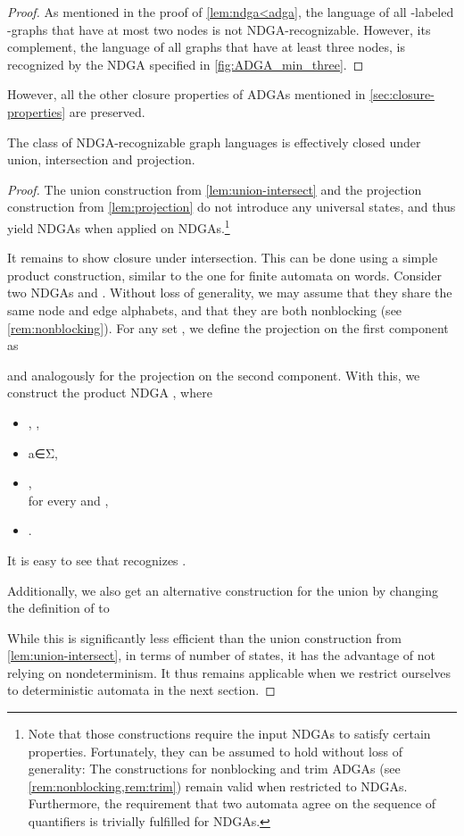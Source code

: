 \documentclass[a4paper,11pt,twoside]{report} \pdfoutput=1
\begin{document}
\begin{proof}
  As mentioned in the proof of \cref{lem:ndga<adga}, the language
   of all -labeled -graphs that
  have at most two nodes is not NDGA-recognizable. However, its
  complement, the language  of all graphs that have at
  least three nodes, is recognized by the NDGA  specified
  in \cref{fig:ADGA_min_three}.
\end{proof}

However, all the other closure properties of ADGAs mentioned in
\cref{sec:closure-properties} are preserved.

\begin{lemma} \label{lem:ndga-closure}
  The class  of NDGA-recognizable graph languages is
  effectively closed under union, intersection and projection.
\end{lemma}

\begin{proof}
  The union construction from \cref{lem:union-intersect} and the
  projection construction from \cref{lem:projection} do not introduce
  any universal states, and thus yield NDGAs when applied on
  NDGAs.\footnote{Note that those constructions require the input
    NDGAs to satisfy certain properties. Fortunately, they can be
    assumed to hold without loss of generality: The constructions for
    nonblocking and trim ADGAs (see \cref{rem:nonblocking,rem:trim})
    remain valid when restricted to NDGAs. Furthermore, the
    requirement that two automata agree on the sequence of quantifiers
    is trivially fulfilled for NDGAs.}

  It remains to show closure under intersection. This can be done
  using a simple product construction, similar to the one for finite
  automata on words. Consider two NDGAs
   and . Without loss of generality, we may assume that they
  share the same node and edge alphabets, and that they are both
  nonblocking (see \cref{rem:nonblocking}). For any set ,
  we define the projection on the first component as
  
  and analogously for the projection  on the second
  component. With this, we construct the product NDGA
  , where
  \begin{itemize}
  \item , \quad ,
  \item
    a∈Σ,
  \item
    , \\
    for every  and \!,
  \item .
  \end{itemize}
  It is easy to see that  recognizes .

  Additionally, we also get an alternative construction for the union
  by changing the definition of  to
  
  While this is significantly less efficient than the union
  construction from \cref{lem:union-intersect}, in terms of number of
  states, it has the advantage of not relying on nondeterminism. It
  thus remains applicable when we restrict ourselves to deterministic
  automata in the next section.
\end{proof}
\end{document}

